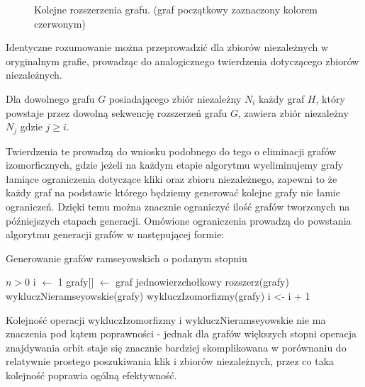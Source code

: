 \begin{figure}[H]
   		\caption{Kolejne rozszerzenia grafu. (graf początkowy zaznaczony kolorem czerwonym)}
   		\label{rozszerzeniekliki}
\end{figure}
Identyczne rozumowanie można przeprowadzić dla zbiorów niezależnych w oryginalnym grafie, prowadząc do analogicznego twierdzenia dotyczącego zbiorów niezależnych.
\begin{theorem}
Dla dowolnego grafu $G$ posiadającego zbiór niezależny $N_i$ każdy graf $H$, który powstaje przez dowolną sekwencję rozszerzeń grafu $G$, zawiera zbiór niezależny $N_j$ gdzie $j \geq i$.
\end{theorem}
Twierdzenia te prowadzą do wniosku podobnego do tego o eliminacji grafów izomorficznych, gdzie jeżeli na każdym etapie algorytmu wyeliminujemy grafy łamiące ograniczenia dotyczące kliki oraz zbioru niezależnego, zapewni to że każdy graf na podstawie którego będziemy generować kolejne grafy nie łamie ograniczeń. Dzięki temu można znacznie ograniczyć ilość grafów tworzonych na późniejszych etapach generacji. 
Omówione ograniczenia prowadzą do powstania algorytmu generacji grafów w następującej formie:

\begin{algorithm}[H]
  \caption{Generowanie grafów ramseyowskich o podanym stopniu}
  \begin{algorithmic}
  \REQUIRE $n > 0 $
  \STATE i $\gets$ 1
  \STATE grafy[] $\gets$ graf jednowierzchołkowy 
    \STATE rozszerz(grafy)
    \STATE wykluczNieramseyowskie(grafy)
    \STATE wykluczIzomorfizmy(grafy)
    \STATE i <- i + 1
  \ENDWHILE
  \end{algorithmic}
\end{algorithm}

Kolejność operacji wykluczIzomorfizmy i wykluczNieramseyowskie nie ma znaczenia pod kątem poprawności - jednak dla grafów większych stopni operacja znajdywania orbit staje się znacznie bardziej skomplikowana w porównaniu do relatywnie prostego poszukiwania klik i zbiorów niezależnych, przez co taka kolejność poprawia ogólną efektywność. 

